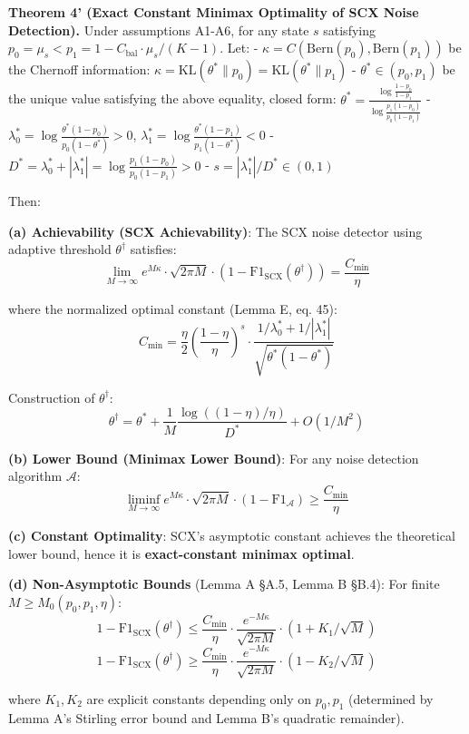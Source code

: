 \documentclass[
  12pt,
]{article}
\begin{document}
\textbf{Theorem 4' (Exact Constant Minimax Optimality of SCX Noise Detection).} Under assumptions A1-A6, for any state \(s\) satisfying \(p_0 = \mu_s < p_1 = 1 - C_{\text{bal}} \cdot \mu_s/(K-1)\). Let: - \(\kappa = C(\text{Bern}(p_0), \text{Bern}(p_1))\) be the Chernoff information: \(\kappa = \text{KL}(\theta^* \| p_0) = \text{KL}(\theta^* \| p_1)\) - \(\theta^* \in (p_0, p_1)\) be the unique value satisfying the above equality, closed form: \(\theta^* = \frac{\log\frac{1-p_0}{1-p_1}}{\log\frac{p_1(1-p_0)}{p_0(1-p_1)}}\) - \(\lambda_0^* = \log\frac{\theta^*(1-p_0)}{p_0(1-\theta^*)} > 0\), \(\lambda_1^* = \log\frac{\theta^*(1-p_1)}{p_1(1-\theta^*)} < 0\) - \(D^* = \lambda_0^* + |\lambda_1^*| = \log\frac{p_1(1-p_0)}{p_0(1-p_1)} > 0\) - \(s = |\lambda_1^*| / D^* \in (0,1)\)

Then:

\textbf{(a) Achievability (SCX Achievability)}: The SCX noise detector using adaptive threshold \(\theta^\dagger\) satisfies:
\[\lim_{M\to\infty} e^{M\kappa} \cdot \sqrt{2\pi M} \cdot (1 - \text{F1}_{\text{SCX}}(\theta^\dagger)) = \frac{C_{\min}}{\eta}\]

where the normalized optimal constant (Lemma E, eq. 45):
\[\boxed{C_{\min} = \frac{\eta}{2} \left(\frac{1-\eta}{\eta}\right)^{s} \cdot \frac{1/\lambda_0^* + 1/|\lambda_1^*|}{\sqrt{\theta^*(1-\theta^*)}}}\]

Construction of \(\theta^\dagger\):
\[\theta^\dagger = \theta^* + \frac{1}{M}\frac{\log((1-\eta)/\eta)}{D^*} + O(1/M^2)\]

\textbf{(b) Lower Bound (Minimax Lower Bound)}: For any noise detection algorithm \(\mathcal{A}\):
\[\liminf_{M\to\infty} e^{M\kappa} \cdot \sqrt{2\pi M} \cdot (1 - \text{F1}_{\mathcal{A}}) \geq \frac{C_{\min}}{\eta}\]

\textbf{(c) Constant Optimality}: SCX's asymptotic constant achieves the theoretical lower bound, hence it is \textbf{exact-constant minimax optimal}.

\textbf{(d) Non-Asymptotic Bounds} (Lemma A §A.5, Lemma B §B.4): For finite \(M \geq M_0(p_0, p_1, \eta)\):
\[1 - \text{F1}_{\text{SCX}}(\theta^\dagger) \leq \frac{C_{\min}}{\eta} \cdot \frac{e^{-M\kappa}}{\sqrt{2\pi M}} \cdot (1 + K_1/\sqrt{M})\]
\[1 - \text{F1}_{\text{SCX}}(\theta^\dagger) \geq \frac{C_{\min}}{\eta} \cdot \frac{e^{-M\kappa}}{\sqrt{2\pi M}} \cdot (1 - K_2/\sqrt{M})\]

where \(K_1, K_2\) are explicit constants depending only on \(p_0, p_1\) (determined by Lemma A's Stirling error bound and Lemma B's quadratic remainder).
\end{document}
